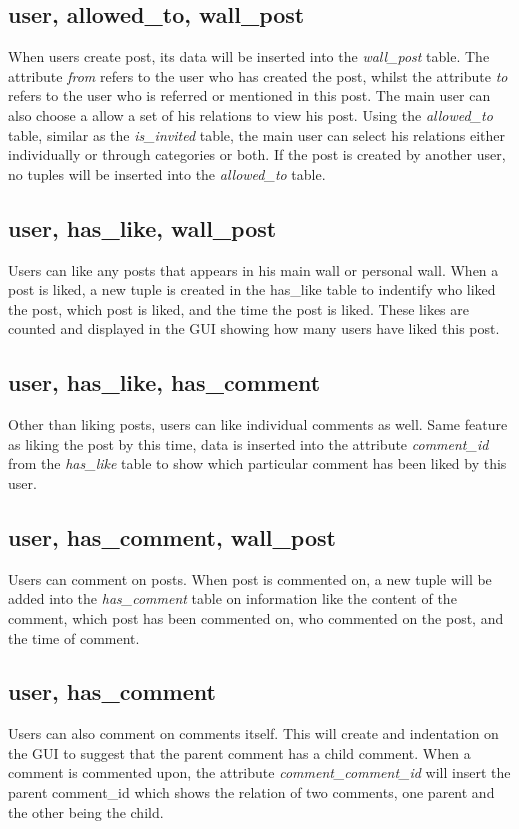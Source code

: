 \subsection{user, allowed\_to, wall\_post}
When users create post, its data will be inserted into the {\it wall\_post} table. The attribute {\it from} refers to the user who has created the post, whilst the attribute {\it to} refers to the user who is referred or mentioned in this post. The main user can also choose a allow a set of his relations to view his post. Using the {\it allowed\_to} table, similar as the {\it is\_invited} table, the main user can select his relations either individually or through categories or both. If the post is created by another user, no tuples will be inserted into the {\it allowed\_to} table.

\subsection{user, has\_like, wall\_post}
Users can like any posts that appears in his main wall or personal wall. When a post is liked, a new tuple is created in the has\_like table to indentify who liked the post, which post is liked, and the time the post is liked. These likes are counted and displayed in the GUI showing how many users have liked this post.

\subsection{user, has\_like, has\_comment}
Other than liking posts, users can like individual comments as well. Same feature as liking the post by this time, data is inserted into the attribute {\it comment\_id} from the {\it has\_like} table to show which particular comment has been liked by this user.

\subsection{user, has\_comment, wall\_post}
Users can comment on posts. When post is commented on, a new tuple will be added into the {\it has\_comment} table on information like the content of the comment, which post has been commented on, who commented on the post, and the time of comment.

\subsection{user, has\_comment}
Users can also comment on comments itself. This will create and indentation on the GUI to suggest that the parent comment has a child comment. When a comment is commented upon, the attribute {\it comment\_comment\_id} will insert the parent comment\_id which shows the relation of two comments, one parent and the other being the child.

